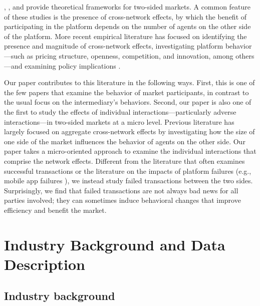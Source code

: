 \documentclass[reviewmode]{AEA}
\begin{document}
\citet{armstrong2006competition}, \citet{caillaud2001competing,caillaud2003chicken}, and \citet{rochet2003platform,rochet2006two} provide theoretical frameworks for two-sided markets. A common feature of these studies is the presence of cross-network effects, by which the benefit of participating in the platform depends on the number of agents on the other side of the platform. More recent empirical literature has focused on identifying the presence and magnitude of cross-network effects, investigating platform behavior---such as pricing structure, openness, competition, and innovation, among others---and examining policy implications \citep{rysman2009economics, sriram2015platforms}.

Our paper contributes to this literature in the following ways.  First, this is one of the few papers that examine the behavior of market participants, in contrast to the usual focus on the intermediary's behaviors. 
Second, our paper is also one of the first to study the effects of individual interactions---particularly adverse interactions---in two-sided markets at a micro level. Previous literature has largely focused on aggregate cross-network effects by investigating how the size of one side of the market influences the behavior of agents on the other side. Our paper takes a micro-oriented approach to examine the individual interactions that comprise the network effects. Different from the literature that often  examines successful transactions \citep{zhang2017meet,lin2015home,chintagunta2017quantifying,dai2018multistep} or the literature on the impacts of platform failures (e.g., mobile app failures \citep{narang2018impact}), we instead study failed transactions between the two sides. Surprisingly, we find that failed transactions are not always bad news for all parties involved; they can sometimes induce behavioral changes that improve efficiency and benefit the market.


\section{Industry Background and Data Description}


\subsection{Industry background}
\end{document}
